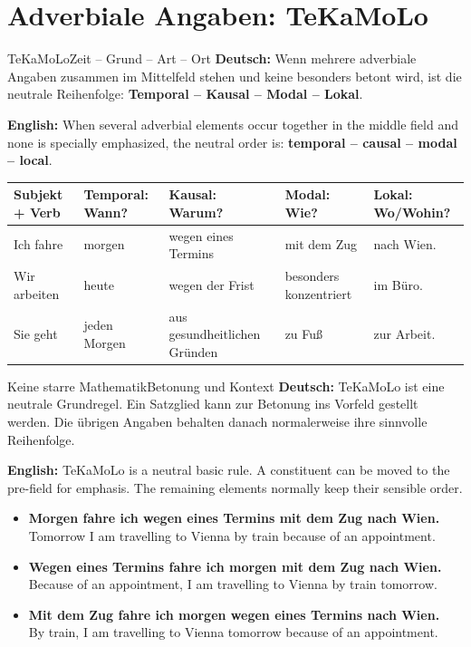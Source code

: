 \documentclass[a4paper,11pt]{article}
\newcommand{\GermanText}[1]{\textbf{Deutsch: }#1\par}
\newcommand{\EnglishText}[1]{{\small\color{SoftGray}\textbf{English: }#1\par}}
\newcommand{\ExampleItem}[2]{\item \textbf{#1}\\{\small\color{SoftGray}#2}}
\newcommand{\TableHeader}[1]{\color{white}\textbf{#1}}
\begin{document}
    
    \section{Adverbiale Angaben: TeKaMoLo}
        
        \begin{grammarentry}{TeKaMoLo}{Zeit -- Grund -- Art -- Ort}
            \GermanText{Wenn mehrere adverbiale Angaben zusammen im Mittelfeld stehen und keine besonders betont wird, ist die neutrale Reihenfolge: \textbf{Temporal -- Kausal -- Modal -- Lokal}.}
            \EnglishText{When several adverbial elements occur together in the middle field and none is specially emphasized, the neutral order is: \textbf{temporal -- causal -- modal -- local}.}
        \end{grammarentry}
        
        \begin{longtable}{|p{2.5cm}|p{3.0cm}|p{3.0cm}|p{3.0cm}|p{3.0cm}|}
            \hline
            \rowcolor{HeaderBlueDark}
            \TableHeader{Subjekt + Verb} & \TableHeader{Temporal: Wann?} & \TableHeader{Kausal: Warum?} & \TableHeader{Modal: Wie?} & \TableHeader{Lokal: Wo/Wohin?} \\
            \hline
            Ich fahre & morgen & wegen eines Termins & mit dem Zug & nach Wien. \\
            \hline
            Wir arbeiten & heute & wegen der Frist & besonders konzentriert & im Büro. \\
            \hline
            Sie geht & jeden Morgen & aus gesundheitlichen Gründen & zu Fuß & zur Arbeit. \\
            \hline
        \end{longtable}
        
        \begin{grammarentry}{Keine starre Mathematik}{Betonung und Kontext}
            \GermanText{TeKaMoLo ist eine neutrale Grundregel. Ein Satzglied kann zur Betonung ins Vorfeld gestellt werden. Die übrigen Angaben behalten danach normalerweise ihre sinnvolle Reihenfolge.}
            \EnglishText{TeKaMoLo is a neutral basic rule. A constituent can be moved to the pre-field for emphasis. The remaining elements normally keep their sensible order.}
        \end{grammarentry}
        
        \begin{exbox}
            \begin{itemize}
                \ExampleItem{Morgen fahre ich wegen eines Termins mit dem Zug nach Wien.}{Tomorrow I am travelling to Vienna by train because of an appointment.}
                \ExampleItem{Wegen eines Termins fahre ich morgen mit dem Zug nach Wien.}{Because of an appointment, I am travelling to Vienna by train tomorrow.}
                \ExampleItem{Mit dem Zug fahre ich morgen wegen eines Termins nach Wien.}{By train, I am travelling to Vienna tomorrow because of an appointment.}
            \end{itemize}
        \end{exbox}
    
\end{document}

